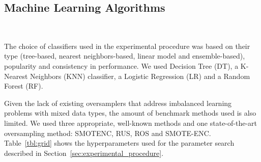 \documentclass[preprint,12pt]{elsarticle}
\begin{document}
{\subsection{Machine Learning Algorithms}~\label{sec:ml_algorithms}

The choice of classifiers used in the experimental procedure was based on
their type (tree-based, nearest neighbors-based, linear model and
ensemble-based), popularity and consistency in performance. We used Decision
Tree (DT), a K-Nearest Neighbors (KNN) classifier, a Logistic
Regression (LR) and a Random Forest (RF).

Given the lack of existing oversamplers that address imbalanced learning
problems with mixed data types, the amount of benchmark methods used is also
limited. We used three appropriate, well-known methods and one state-of-the-art
oversampling method: SMOTENC, RUS, ROS and SMOTE-ENC\@. Table~\ref{tbl:grid}
shows the hyperparameters used for the parameter search described in
Section~\ref{sec:experimental_procedure}.

}
\end{document}
